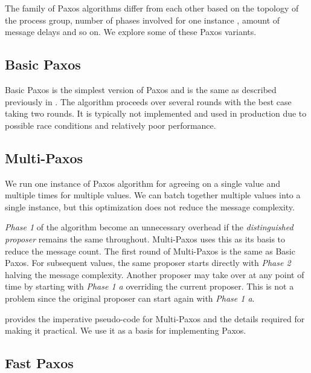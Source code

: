 The family of Paxos algorithms differ from each other based on the topology
of the process group, number of phases involved for one instance%
, amount of message delays and so on. We explore some of these Paxos variants.

\subsection{Basic Paxos}

Basic Paxos is the simplest version of Paxos and is the same as described
previously in . The algorithm proceeds over several rounds%
 with the best case taking two rounds. It is typically not implemented and used
in production due to possible race conditions and relatively poor performance.

\subsection{Multi-Paxos}

We run one instance of Paxos algorithm for agreeing on a single value and
multiple times for multiple values. We can batch together multiple values
into a single instance, but this optimization does not reduce the message
complexity.

\emph{Phase 1} of the algorithm become
an unnecessary overhead if the \emph{distinguished proposer} remains the same
throughout. Multi-Paxos uses this as its basis to reduce the message count.
The first round of Multi-Paxos \citep{dumulti} is the same as Basic Paxos.
For subsequent values, the same
proposer starts directly with \emph{Phase 2} halving the message complexity.
Another proposer may take over at any point of time by starting with
\emph{Phase 1 a} overriding the current proposer. This is not a problem since
the original proposer can start again with \emph{Phase 1 a}.

\citet{Robbert2011} provides the imperative pseudo-code for Multi-Paxos and
the details required for making it practical. We use it as a
basis for implementing Paxos.

\subsection{Fast Paxos}

